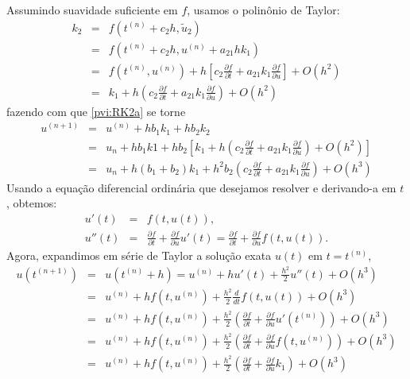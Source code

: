 Assumindo suavidade suficiente em $f$, usamos o polinônio de Taylor:
\begin{eqnarray}
k_2 &=&f(t^{(n)}+c_2h, \tilde{u}_2)\\
   &=&f(t^{(n)}+c_2h, u^{(n)}+ a_{21}h k_1)\\
   &=&f(t^{(n)}, u^{(n)}) + h\left[c_2 \frac{\partial f}{\partial t}+ a_{21} k_1\frac{\partial f}{\partial u}\right]+O(h^2)\\
   &=&k_1 + h\left(c_2 \frac{\partial f}{\partial t}+ a_{21} k_1\frac{\partial f}{\partial u}\right)+O(h^2)
   \end{eqnarray}
fazendo com que \eqref{pvi:RK2a} se torne
\begin{eqnarray}
  u^{(n+1)}&=&u^{(n)}   + h b_1 k_1 + hb_2k_2 \\
         &=&u_n  + h b_1 k1 + hb_2\left[ k_1 + h\left(c_2 \frac{\partial f}{\partial t}+ a_{21} k_1\frac{\partial f}{\partial u}\right)+O(h^2)\right]\\
         &=&u_n  + h (b_1+b_2) k_1 + h^2 b_2\left(c_2 \frac{\partial f}{\partial t}+ a_{21} k_1\frac{\partial f}{\partial u}\right)+O(h^3)\label{pvi:rk2_1}
\end{eqnarray}
Usando a equação diferencial ordinária que desejamos resolver e derivando-a em $t$, obtemos:
\begin{eqnarray}
  u'(t)    &=&f(t,u(t)),\\
  u''(t) &=&\frac{\partial f}{\partial t}+\frac{\partial f}{\partial u} u'(t) = \frac{\partial f}{\partial t} +\frac{\partial f}{\partial u} f(t,u(t)).
\end{eqnarray}
Agora,  expandimos em série de Taylor a solução exata $u(t)$ em $t=t^{(n)}$,
\begin{eqnarray}
  u(t^{(n+1)})&=&u(t^{(n)}+h)=u^{(n)}  + hu'(t) +\frac{h^2}{2} u''(t) + O(h^3)\\
            &=&u^{(n)}  + hf(t,u^{(n)}) +\frac{h^2}{2}\frac{d }{d t}f(t,u(t))+O(h^3)\\
	    &=&u^{(n)}  + hf(t,u^{(n)}) +\frac{h^2}{2}\left(\frac{\partial f}{\partial t}+\frac{\partial f}{\partial u}u'(t^{(n)})\right) +O(h^3)\\
           &=&u^{(n)}  + hf(t,u^{(n)}) +\frac{h^2}{2}\left(\frac{\partial f}{\partial t}+\frac{\partial f}{\partial u}f(t,u^{(n)})\right) +O(h^3)\\
           &=&u^{(n)}  + hf(t,u^{(n)}) +\frac{h^2}{2}\left(\frac{\partial f}{\partial t}+\frac{\partial f}{\partial u}k_1\right) +O(h^3)\label{pvi:rk2_2}
           \end{eqnarray}
